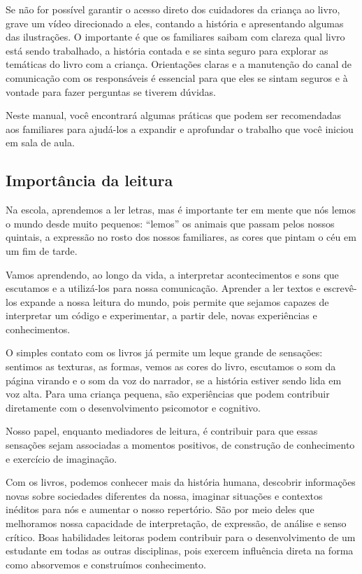 \documentclass[11pt]{extarticle}
\begin{document}
Se não for possível garantir o acesso direto dos cuidadores da criança ao livro, 
grave um vídeo direcionado a eles, contando a história e apresentando algumas 
das ilustrações. O importante é que os familiares saibam com clareza qual livro 
está sendo trabalhado, a história contada e se sinta seguro para explorar as temáticas 
do livro com a criança. Orientações claras e a manutenção do canal de comunicação com 
os responsáveis é essencial para que eles se sintam seguros e à vontade para fazer perguntas 
se tiverem dúvidas. 

Neste manual, você encontrará algumas práticas que podem ser 
recomendadas aos familiares para ajudá-los a expandir e aprofundar o trabalho 
que você iniciou em sala de aula.


\subsection{Importância da leitura}
Na escola, aprendemos a ler letras, mas é importante ter em mente que nós 
lemos o mundo desde muito pequenos: “lemos” os animais que passam pelos nossos 
quintais, a expressão no rosto dos nossos familiares, as cores que pintam o céu 
em um fim de tarde. 

Vamos aprendendo, ao longo da vida, a interpretar acontecimentos 
e sons que escutamos e a utilizá-los para nossa comunicação. Aprender a ler textos e 
escrevê-los expande a nossa leitura do mundo, pois permite que sejamos capazes de 
interpretar um código e experimentar, a partir dele, novas experiências e conhecimentos. 

O simples contato com os livros já permite um leque grande de sensações: 
sentimos as texturas, as formas, vemos as cores do livro, escutamos o som da página 
virando e o som da voz do narrador, se a história estiver sendo lida em voz alta. Para uma 
criança pequena, são experiências que podem contribuir diretamente com o desenvolvimento psicomotor 
e cognitivo. 

Nosso papel, enquanto mediadores de leitura, é contribuir para que essas 
sensações sejam associadas a momentos positivos, de construção de 
conhecimento e exercício de imaginação. 

Com os livros, podemos conhecer mais da história humana, descobrir informações 
novas sobre sociedades diferentes da nossa, imaginar situações e contextos inéditos 
para nós e aumentar o nosso repertório. São por meio deles que melhoramos nossa 
capacidade de interpretação, de expressão, de análise e senso crítico. Boas habilidades 
leitoras podem contribuir para o desenvolvimento de um estudante em todas as outras 
disciplinas, pois exercem influência direta na forma como absorvemos e 
construímos conhecimento.
\end{document}
